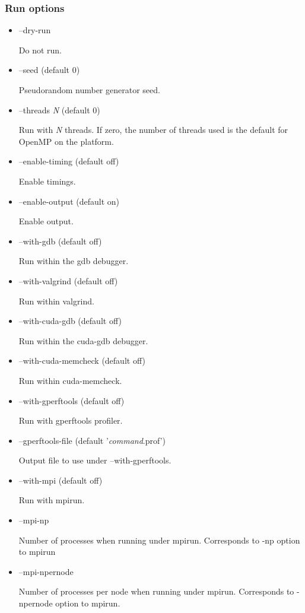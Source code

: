 \subsubsection{Run options}
\begin{itemize}
\item {\sf --dry-run}

Do not run.

\item {\sf --seed} (default 0)

Pseudorandom number generator seed.

\item {\sf --threads \textsl{N}} (default 0)

Run with {\sf \textsl{N}} threads. If zero, the number of threads used is the
default for OpenMP on the platform.

\item {\sf --enable-timing} (default off)

Enable timings.

\item {\sf --enable-output} (default on)

Enable output.

\item {\sf --with-gdb} (default off)

Run within the {\sf gdb} debugger.

\item {\sf --with-valgrind} (default off)

Run within {\sf valgrind}.

\item {\sf --with-cuda-gdb} (default off)

Run within the {\sf cuda-gdb} debugger.

\item {\sf --with-cuda-memcheck} (default off)

Run within {\sf cuda-memcheck}.

\item {\sf --with-gperftools} (default off)

Run with {\sf gperftools} profiler.

\item {\sf --gperftools-file} (default '\textsl{command}.prof')

Output file to use under {\sf --with-gperftools}.

\item {\sf --with-mpi} (default off)

Run with {\sf mpirun}.

\item {\sf --mpi-np}

Number of processes when running under {\sf mpirun}. Corresponds to {\sf -np}
option to {\sf mpirun}

\item {\sf --mpi-npernode}

Number of processes per node when running under {\sf mpirun}. Corresponds to
{\sf -npernode} option to {\sf mpirun}.

\end{itemize}

